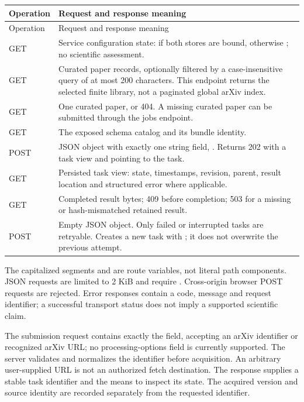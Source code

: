 \begin{longtable}{@{}P{62mm}P{76mm}@{}}
\toprule
Operation & Request and response meaning \\
\midrule\endfirsthead
\toprule Operation & Request and response meaning \\
\midrule\endhead
GET  & Service configuration state:  if both stores are bound, otherwise ; no scientific assessment. \\
GET  & Curated paper records, optionally filtered by a case-insensitive query of at most 200 characters. This endpoint returns the selected finite library, not a paginated global arXiv index. \\
GET  & One curated paper, or 404. A missing curated paper can be submitted through the jobs endpoint. \\
GET  & The exposed schema catalog and its bundle identity. \\
POST  & JSON object with exactly one string field, . Returns 202 with a task view and  pointing to the task. \\
GET  & Persisted task view: state, timestamps, revision, parent, result location and structured error where applicable. \\
GET  & Completed result bytes; 409 before completion; 503 for a missing or hash-mismatched retained result. \\
POST  & Empty JSON object. Only failed or interrupted tasks are retryable. Creates a new task with ; it does not overwrite the previous attempt. \\
\bottomrule
\end{longtable}

The capitalized segments  and  are route variables, not literal path components. JSON requests are limited to 2 KiB and require . Cross-origin browser POST requests are rejected. Error responses contain a code, message and request identifier; a successful transport status does not imply a supported scientific claim.

 The submission request contains exactly the  field, accepting an arXiv identifier or recognized arXiv URL; no processing-options field is currently supported. The server validates and normalizes the identifier before acquisition. An arbitrary user-supplied URL is not an authorized fetch destination. The response supplies a stable task identifier and the means to inspect its state. The acquired version and source identity are recorded separately from the requested identifier.

